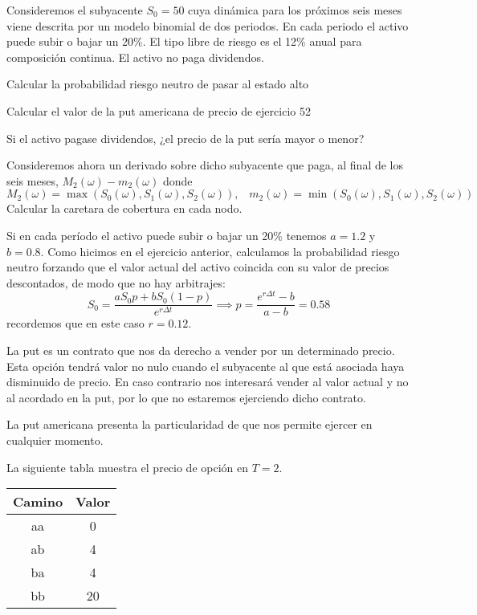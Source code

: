 \begin{problem}[2]
Consideremos el subyacente $S_0=50$ cuya dinámica para los próximos seis meses viene descrita por un modelo binomial de dos periodos. En cada periodo el activo puede subir o bajar un 20\%. El tipo libre de riesgo es el 12\% anual para composición continua. El activo no paga dividendos.

\ppart Calcular la probabilidad riesgo neutro de pasar al estado alto

\ppart Calcular el valor de la put americana de precio de ejercicio 52

\ppart Si el activo pagase dividendos, ¿el precio de la put sería mayor o menor?

\ppart Consideremos ahora un derivado sobre dicho subyacente que paga, al final de los seis meses, $M_2(ω)-m_2(ω)$ donde
\[M_2(ω)=\max(S_0(ω),S_1(ω),S_2(ω)), \;\;\; m_2(ω)=\min(S_0(ω),S_1(ω),S_2(ω))\]
Calcular la caretara de cobertura en cada nodo.

\solution
{}

\spart

Si en cada período el activo puede subir o bajar un 20\% tenemos $a=1.2$ y $b=0.8$. Como hicimos en el ejercicio anterior, calculamos la probabilidad riesgo neutro forzando que el valor actual del activo coincida con su valor de precios descontados, de modo que no hay arbitrajes:
\[S_0 = \frac{aS_0p + bS_0(1-p)}{e^{rΔt}} \implies p = \frac{e^{rΔt}-b}{a-b} = 0.58\]
recordemos que en este caso $r=0.12$.

\spart

La put es un contrato que nos da derecho a vender por un determinado precio. Esta opción tendrá valor no nulo cuando el subyacente al que está asociada haya disminuido de precio. En caso contrario nos interesará vender al valor actual y no al acordado en la put, por lo que no estaremos ejerciendo dicho contrato.

La put americana presenta la particularidad de que nos permite ejercer en cualquier momento.

La siguiente tabla muestra el precio de opción en $T=2$.

\begin{center}
\begin{tabular}{|c|c|}
\hline
\textbf{Camino} & \textbf{Valor}\\
\hline
aa & 0 \\
ab & 4 \\
ba & 4 \\
bb & 20 \\
\hline
\end{tabular}
\end{center}


\end{problem}
